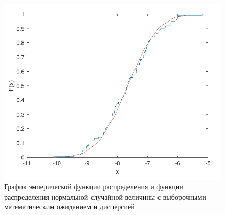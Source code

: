 \documentclass{bmstu}
\begin{document}
\begin{figure}[H]
	\centering
	\includegraphics[width=\textwidth]{img/graph2.pdf}
	\caption{График эмперической функции распределения и функции распределения нормальной случайной величины с выборочными математическим ожиданием и дисперсией}
\end{figure}
\end{document}
